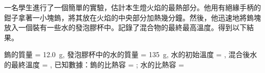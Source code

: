{
    一名學生進行了一個簡單的實驗，估計本生燈火焰的最熱部分。他用有絕緣手柄的鉗子拿著一小塊鎢，將其放在火焰的中央部分加熱幾分鐘。然後，他迅速地將鎢塊放入一個裝有一些水的發泡膠杯中。記錄了混合物的最終最高溫度。得到以下結果。
    \par 鎢的質量 = \qty{12.0}{g},
    發泡膠杯中的水的質量 = \qty{135}{g},
    水的初始溫度 = ,
    混合後水的最終溫度 = ,
    已知數據：鎢的比熱容 = ; 水的比熱容 = 

    }

